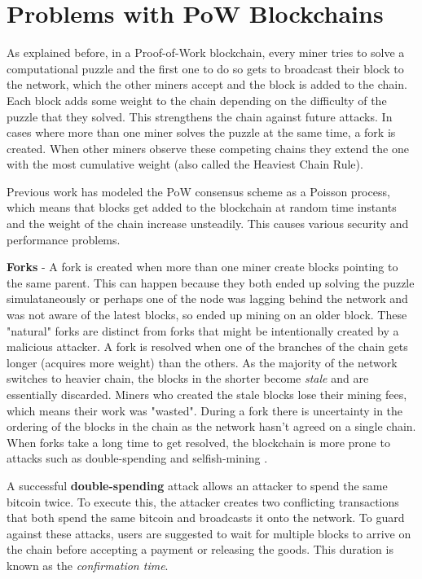 
\newpage
\section{Problems with PoW Blockchains} \label{intro-problems}

As explained before, in a Proof-of-Work blockchain, every miner tries to solve a computational puzzle and the first one to do so gets to broadcast their block to the network, which the other miners accept and the block is added to the chain. 
Each block adds some weight to the chain depending on the difficulty of the puzzle that they solved. 
This strengthens the chain against future attacks.
In cases where more than one miner solves the puzzle at the same time, a fork is created. 
When other miners observe these competing chains they extend the one with the most cumulative weight (also called the Heaviest Chain Rule). 

Previous work \cite{bitcoinOriginal, Rosenfeld} has modeled the PoW consensus scheme as a Poisson process, which means that blocks get added to the blockchain at random time instants and the weight of the chain increase unsteadily. 
This causes various security and performance problems.

\textbf{Forks} - A fork is created when more than one miner create blocks pointing to the same parent. 
This can happen because they both ended up solving the puzzle simulataneously or perhaps one of the node was lagging behind the network and was not aware of the latest blocks, so ended up mining on an older block. 
These "natural" forks are distinct from forks that might be intentionally created by a malicious attacker.
A fork is resolved when one of the branches of the chain gets longer (acquires more weight) than the others.
As the majority of the network switches to heavier chain, the blocks in the shorter become \textit{stale} and are essentially discarded. 
Miners who created the stale blocks lose their mining fees, which means their work was "wasted".
During a fork there is uncertainty in the ordering of the blocks in the chain as the network hasn't agreed on a single chain.
When forks take a long time to get resolved, the blockchain is more prone to attacks such as double-spending and selfish-mining \cite{selfishmining, selfishMiningStrategies}. 

A successful \textbf{double-spending} attack allows an attacker to spend the same bitcoin twice.
To execute this, the attacker creates two conflicting transactions that both spend the same bitcoin and broadcasts it onto the network. 
To guard against these attacks, users are suggested to wait for multiple blocks to arrive on the chain before accepting a payment or releasing the goods. This duration is known as the \textit{confirmation time}.

